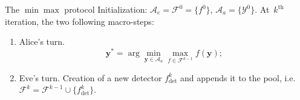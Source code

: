 \documentclass[10pt,aspectratio=169]{beamer}
\newcommand{\fdet}{f_{\mathrm{det}}}
\newcommand{\fset}{\mathcal{F}}
\DeclareMathOperator*{\argmin}{arg\,min} %
\begin{document}

    


\begin{frame}{The $\min\max$ protocol}
    Initialization: $\mathcal{A}_e = \fset^{0} = \{f^0\}$,  $\mathcal{A}_a = \{\mathcal{Y}^0\}$.
    \pause
    At~$k^{\mathrm{th}}$ iteration, the two following macro-steps: 
    \begin{enumerate}
        \item \alert<2>{Alice's turn.} 
            \begin{equation}
                \mathbf{y}^\ast = \arg \min_{\mathbf{y} \in \mathcal{A}_a} \max_{f \in \fset^{k-1}} f(\mathbf{y});
                \label{eq:stepone}	
            \end{equation}
            \pause
        \item Eve's turn. Creation of a new detector $\fdet^k$ and appends it to the pool, i.e. $\fset^k = \fset^{k-1} \cup \{\fdet^k\}.$
    \end{enumerate}
\end{frame}

\end{document}
